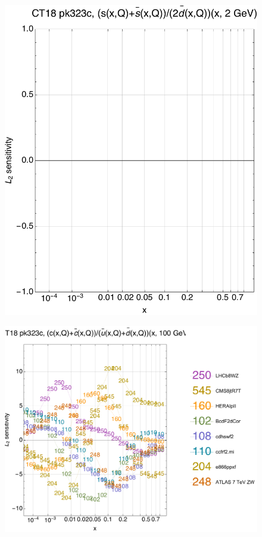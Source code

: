 \documentclass[10pt,aps,prd,floatfix,titlepage]{revtex4}
\begin{document}
\begin{figure}
\includegraphics[width=\textwidth,height=0.44\textheight,keepaspectratio]{2/rat_ifl6_ct18nn_L2_q2_Sf_2.pdf}
\caption{}
\end{figure}
\clearpage
\begin{figure}
\includegraphics[width=\textwidth,height=0.44\textheight,keepaspectratio]{2/rat_ifl7_ct18nn_L2_q100_Sf_2.pdf}
\caption{}
\end{figure}
\end{document}
